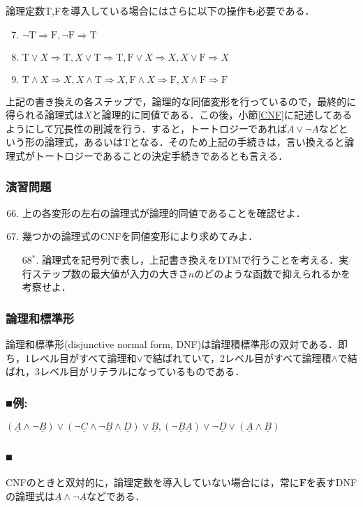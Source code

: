 \documentclass{ltjsarticle}
\theoremstyle{mystyle1}
\theoremstyle{mystyle3}
\theoremstyle{mystyle2}
\newcommand{\uA}{\underline{A}}
\newcommand{\uB}{\underline{B}}
\newcommand{\uC}{\underline{C}}
\newcommand{\uD}{\underline{D}}
\newcommand{\bF}{\ensuremath{\mathbf{F}}}
\newcommand{\rT}{\ensuremath{\mathrm{T}}}
\newcommand{\rF}{\ensuremath{\mathrm{F}}}
\newcommand{\red}[1]{{\color{red} #1}}
\begin{document}
論理定数T,Fを導入している場合にはさらに以下の操作も必要である．
\begin{enumerate}
  \setcounter{enumi}{6}
  \item $\neg \rT \Rightarrow \rF, \neg\rF\Rightarrow\rT$
  \item $\rT\vee X\Rightarrow\rT, X\vee\rT\Rightarrow\rT, \rF\vee X\Rightarrow X,X\vee\rF\Rightarrow X$
  \item $\rT\wedge X\Rightarrow X,X\wedge\rT\Rightarrow X, \rF\wedge X\Rightarrow\rF,X\wedge\rF\Rightarrow\rF$
\end{enumerate}
上記の書き換えの各ステップで，論理的な同値変形を行っているので，最終的に得られる論理式は$X$と論理的に同値である．この後，小節\ref{CNF}に記述してあるようにして冗長性の削減を行う．すると，トートロジーであれば$A\vee\neg A$などという形の論理式，あるいはTとなる．そのため上記の手続きは，言い換えると論理式がトートロジーであることの決定手続きであるとも言える．
\subsubsection*{演習問題}
\begin{enumerate}
  \setcounter{enumi}{65}
  \item 上の各変形の左右の論理式が論理的同値であることを確認せよ．
  \item 幾つかの論理式のCNFを同値変形により求めてみよ．
  \item[68$^\ast$.] 論理式を記号列で表し，上記書き換えをDTMで行うことを考える．実行ステップ数の最大値が入力の大きさ$n$のどのような函数で抑えられるかを考察せよ．
\end{enumerate}
\subsubsection{論理和標準形}
\red{論理和標準形}(disjunctive normal form, DNF)は論理積標準形の双対である．即ち，1レベル目がすべて論理和$\vee$で結ばれていて，2レベル目がすべて論理積$\wedge$で結ばれ，3レベル目がリテラルになっているものである．
\subsubsection*{■例:}
$(\uA\wedge\neg\uB)\vee(\neg\uC\wedge\neg\uB\wedge\uD)\vee\uB,(\neg\uB\uA)\vee\neg\uD\vee(\uA\wedge\uB)$
\subsubsection*{■}
CNFのときと双対的に，論理定数を導入していない場合には，常に$\bF$を表すDNFの論理式は$\uA\wedge\neg\uA$などである．
\end{document}
